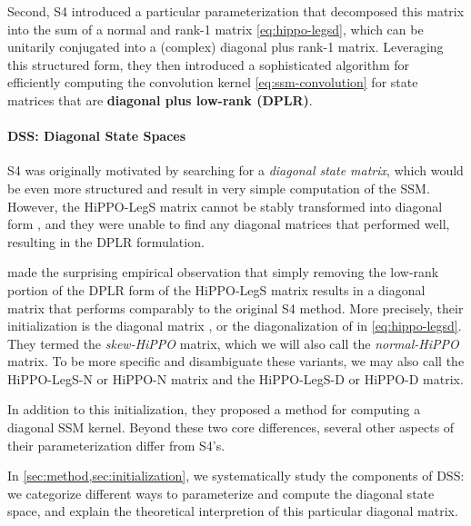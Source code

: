 \documentclass{article}
\begin{document}
Second, S4 introduced a particular parameterization that decomposed this  matrix into the sum of a normal and rank-1 matrix \eqref{eq:hippo-legsd}, which can be unitarily conjugated into a (complex) diagonal plus rank-1 matrix.
Leveraging this structured form, they then introduced a sophisticated algorithm for efficiently computing the convolution kernel \eqref{eq:ssm-convolution} for state matrices that are \textbf{diagonal plus low-rank (DPLR)}.

\small
\begin{minipage}{.5\linewidth}
\end{minipage}
\begin{minipage}{.5\linewidth}
\end{minipage}
\normalsize



\paragraph{DSS: Diagonal State Spaces}

S4 was originally motivated by searching for a \emph{diagonal state matrix},
which would be even more structured and result in very simple computation of the SSM.
However, the HiPPO-LegS matrix cannot be stably transformed into diagonal form \citep[Lemma 3.2]{gu2022efficiently},
and they were unable to find any diagonal matrices that performed well, resulting in the DPLR formulation.

\citet{gupta2022diagonal} made the surprising empirical observation that simply removing the low-rank portion of the DPLR form of the HiPPO-LegS matrix results in a diagonal matrix that performs comparably to the original S4 method.
More precisely, their initialization is the diagonal matrix , or the diagonalization of  in \eqref{eq:hippo-legsd}.
They termed  the \emph{skew-HiPPO} matrix,
which we will also call the \emph{normal-HiPPO} matrix.
To be more specific and disambiguate these variants, we may also call  the HiPPO-LegS-N or HiPPO-N matrix and  the HiPPO-LegS-D or HiPPO-D matrix.

In addition to this initialization, they proposed a method for computing a diagonal SSM kernel.
Beyond these two core differences, several other aspects of their parameterization differ from S4's.

In \cref{sec:method,sec:initialization}, we systematically study the components of DSS:
we categorize different ways to parameterize and compute the diagonal state space,
and explain the theoretical interpretion of this particular diagonal  matrix.
\end{document}
